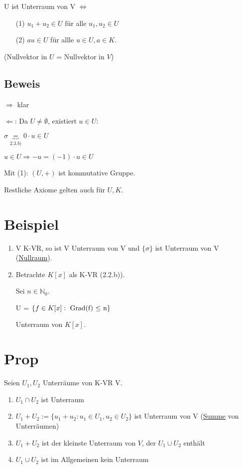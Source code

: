 \documentclass[a4paper, openany]{book}
\begin{document}
    U ist Unterraum von V $\Leftrightarrow$ 

    \begin{enumerate}
      \item[(1)] $u_1 + u_2 \in U$ für alle $u_1,u_2 \in U$
      \item[(2)] $au \in U$ für allle $u \in U, a \in K$.
    \end{enumerate}

    (Nullvektor in $U$ = Nullvektor in $V$)

    \subsection{Beweis}               
    $\Rightarrow$ klar

    $\Leftarrow$: Da $U \neq \emptyset$, existiert $u \in U$:

    \begin{center}
      $\sigma \underbrace{=}_{2.3.b)} 0 \cdot u \in U$
    \end{center}

    $u \in U \Rightarrow -u = (-1) \cdot u \in U$

    Mit (1): $(U,+)$ ist kommutative Gruppe.

    Restliche Axiome gelten auch für $U,K$.

    \section{Beispiel}

    \begin{enumerate}[label=(\alph*)]
      \item V K-VR, so ist V Unterraum von V und $\{\sigma\}$ ist Unterraum von V (\underline{Nullraum}).

      \item Betrachte $K[x]$ als K-VR (2.2.b)).

      Sei $n \in \mathbb{N}_0$.

      U = $\{f \in K[x] : \textnormal{ Grad(f) $\le$ n}\}$

      Unterraum von $K[x]$.
    \end{enumerate}

    \section{Prop}

    Seien $U_1, U_2$ Unterräume von K-VR V.

    \begin{enumerate}[label=(\alph*)]
      \item $U_1 \cap U_2$ ist Unterraum
      \item $U_1 + U_2 := \{u_1 +u _2: u_1 \in U_1, u_2 \in U_2\}$ ist Unterraum von V (\underline{Summe} von Unterräumen)
      \item $U_1 + U_2$ ist der kleinste Unterraum von $V$, der $U_1 \cup U_2$ enthält
      \item $U_1 \cup U_2$ ist im Allgemeinen kein Unterraum
    \end{enumerate}
\end{document}
